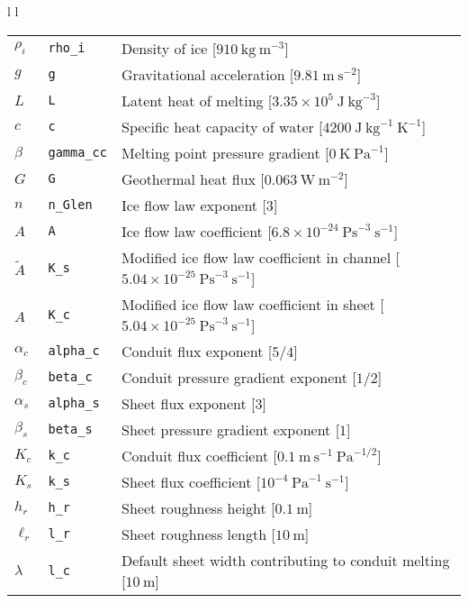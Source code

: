 \documentclass[a4paper,11pt,fleqn]{article}
\newcommand{\un}[1]{\ \textrm{#1}}
\begin{document}
{{\begin{table}[!h]
{\begin{tabular}{l l}
\begin{tabular}[t]{l l l}
$\rho_i$ 		&\verb|rho_i| &  Density of ice [$910\un{kg}\un{m}^{-3}$]\\ 
$g$			&\verb|g| &  Gravitational acceleration [$9.81\un{m}\un{s}^{-2}$]\\
$L$			&\verb|L| &  Latent heat of melting [$3.35\times 10^5\un{J}\un{kg}^{-3}$] \\
$c$ 			&\verb|c| &  Specific heat capacity of water [$4200 \un{J} \un{kg}^{-1}\un{K}^{-1}$]\\
$\beta$ 		&\verb|gamma_cc| &  Melting point pressure gradient [$0 \un{K}\un{Pa}^{-1}$]\\
$G$			&\verb|G| &  Geothermal heat flux [$0.063\un{W}\un{m}^{-2}$]\\
$n$			&\verb|n_Glen| &  Ice flow law exponent [$3$] \\
$A$         		&\verb|A| &  Ice flow law coefficient [$6.8\times 10^{-24} \un{Ps}^{-3} \un{s}^{-1}$]\\
$\tilde{A}$         	&\verb|K_s| &  Modified ice flow law coefficient in channel [$5.04\times 10^{-25} \un{Ps}^{-3} \un{s}^{-1}$]\\
$\hat{A}$         	&\verb|K_c| &  Modified ice flow law coefficient in sheet [$5.04\times 10^{-25} \un{Ps}^{-3} \un{s}^{-1}$]\\
$\alpha_c$        &\verb|alpha_c| &  Conduit flux exponent [$5/4$]\\
$\beta_c$          &\verb|beta_c| &  Conduit pressure gradient exponent [$1/2$]\\
$\alpha_s$ 	&\verb|alpha_s| &  Sheet flux exponent [$3$]\\
$\beta_s$          &\verb|beta_s| &  Sheet pressure gradient exponent [$1$]\\
$K_c$		&\verb|k_c| &  Conduit flux coefficient [$0.1\un{m} \un{s}^{-1} \un{Pa}^{-1/2}$]\\
$K_s$		&\verb|k_s| &  Sheet flux coefficient [$10^{-4} \un{Pa}^{-1}\un{s}^{-1}$] \\
$h_r$		&\verb|h_r| &  Sheet roughness height [$0.1\un{m}$] \\
$\ell_r$		&\verb|l_r| &  Sheet roughness length [$10\un{m}$] \\
$\lambda$	&\verb|l_c| &  Default sheet width contributing to conduit melting [$10\un{m}$] \\

\end{tabular}
\end{tabular}}
\end{table}}}
\end{document}
